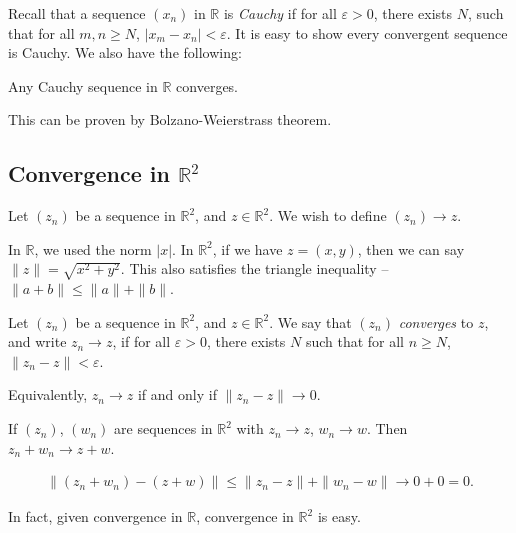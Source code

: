 \documentclass[12pt]{article}
\begin{document}
Recall that a sequence $(x_n)$ in $\mathbb{R}$ is \textit{Cauchy} if for all $\varepsilon > 0$, there exists $N$, such that for all $m, n \geq N$, $|x_m - x_n| < \varepsilon$. It is easy to show every convergent sequence is Cauchy. We also have the following:

\begin{theorem}
\item
	Any Cauchy sequence in $\mathbb{R}$ converges.
\end{theorem}

This can be proven by Bolzano-Weierstrass theorem.

\subsection{Convergence in \texorpdfstring{$\mathbb{R}^2$}{R\^2}}%
\label{sub:convergence_in_r_2_}

Let $(z_n)$ be a sequence in $\mathbb{R}^2$, and $z \in \mathbb{R}^2$. We wish to define $(z_n) \to z$.

In $\mathbb{R}$, we used the norm $|x|$. In $\mathbb{R}^2$, if we have $z = (x, y)$, then we can say $\|z\| = \sqrt{x^2 + y^2}$. This also satisfies the triangle inequality -- $\|a + b\| \leq \|a\| + \|b\|$.

\begin{definition}
	Let $(z_n)$ be a sequence in $\mathbb{R}^2$, and $z \in \mathbb{R}^2$. We say that $(z_n)$ \textit{converges} to $z$, and write $z_n \to z$, if for all $\varepsilon > 0$, there exists $N$ such that for all $n \geq N$, $\|z_n - z\| < \varepsilon$.

	Equivalently, $z_n \to z$ if and only if $\|z_n - z\| \to 0$.
\end{definition}
\begin{lemma}
	If $(z_n)$, $(w_n)$ are sequences in $\mathbb{R}^2$ with $z_n \to z$, $w_n \to w$. Then $z_n + w_n \to z + w$.
\end{lemma}

\begin{proofbox}
\begin{align*}
	\|(z_n + w_n) - (z + w)\| \leq \|z_n - z\| + \|w_n - w\| \to 0 + 0 = 0.
\end{align*}
\end{proofbox}

In fact, given convergence in $\mathbb{R}$, convergence in $\mathbb{R}^2$ is easy.
\end{document}
